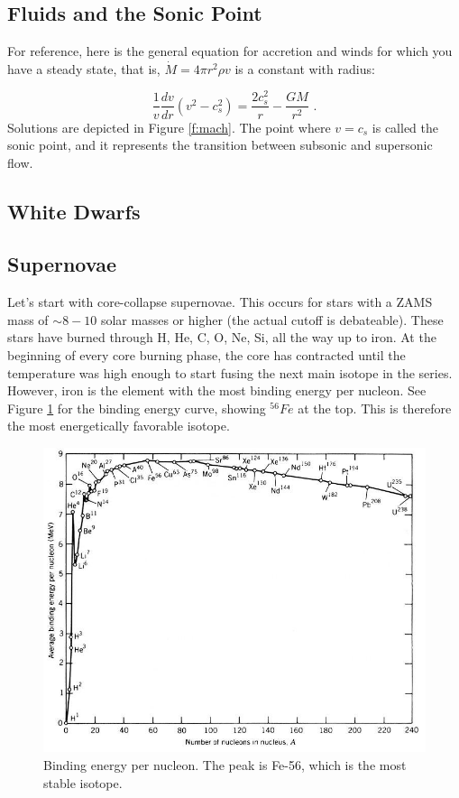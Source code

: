 \subsection{Fluids and the Sonic Point}

For reference, here is the general equation for accretion and winds for which you have a steady state, that is, $\dot{M} = 4 \pi r^2 \rho v$ is a constant with radius:

\begin{equation}
\frac{1}{v} \frac{dv}{dr} (v^2 - c_s^2) = \frac{2 c_s^2}{r} - \frac{G M}{r^2}\,\,.
\end{equation}
Solutions are depicted in Figure \ref{f:mach}. The point where $v = c_s$ is called the sonic point, and it represents the transition between subsonic and supersonic flow.

\subsection{White Dwarfs}

\subsection{Supernovae}

Let's start with core-collapse supernovae. This occurs for stars with a ZAMS mass of $\sim 8-10$ solar masses or higher (the actual cutoff is debateable). These stars have burned through H, He, C, O, Ne, Si, all the way up to iron. At the beginning of every core burning phase, the core has contracted until the temperature was high enough to start fusing the next main isotope in the series. However, iron is the element with the most binding energy per nucleon. See Figure \ref{f:be} for the binding energy curve, showing $^{56}Fe$ at the top. This is therefore the most energetically favorable isotope.

\begin{figure}[!h]
\begin{center}
\includegraphics[width=\textwidth]{binding_energy.jpg}
\caption{Binding energy per nucleon. The peak is Fe-56, which is the most stable isotope. \label{f:be}}
\end{center}
\end{figure}


